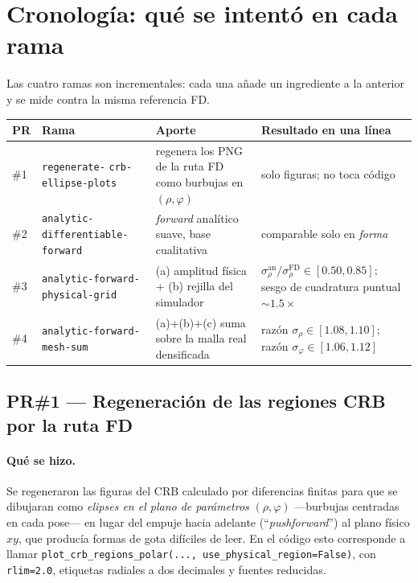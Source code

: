 \documentclass[11pt,a4paper]{article}
\newcommand{\code}[1]{\texttt{#1}}
\theoremstyle{definition}
\begin{document}
\section{Cronología: qué se intentó en cada rama}
\label{sec:cronologia}

Las cuatro ramas son incrementales: cada una añade un ingrediente a la
anterior y se mide contra la misma referencia FD.

\begin{center}
\small
\begin{tabular}{@{}lp{4.3cm}p{5.1cm}p{3.9cm}@{}}
\toprule
PR & Rama & Aporte & Resultado en una línea \\
\midrule
\#1 & \code{regenerate-} \code{crb-ellipse-plots} &
  regenera los PNG de la ruta FD como burbujas en $(\rho,\varphi)$ &
  solo figuras; no toca código \\
\addlinespace
\#2 & \code{analytic-} \code{differentiable-forward} &
  \emph{forward} analítico suave, base cualitativa &
  comparable solo en \emph{forma} \\
\addlinespace
\#3 & \code{analytic-forward-} \code{physical-grid} &
  (a) amplitud física + (b) rejilla del simulador &
  $\sigma_\rho^{\text{an}}/\sigma_\rho^{\text{FD}}\in[0.50,0.85]$;
  sesgo de cuadratura puntual $\sim1.5\times$ \\
\addlinespace
\#4 & \code{analytic-forward-} \code{mesh-sum} &
  (a)+(b)+(c) suma sobre la malla real densificada &
  razón $\sigma_\rho\in[1.08,1.10]$;
  razón $\sigma_\varphi\in[1.06,1.12]$ \\
\bottomrule
\end{tabular}
\end{center}

\subsection{PR\#1 --- Regeneración de las regiones CRB por la ruta FD}
\label{sec:pr1}

\paragraph{Qué se hizo.}
Se regeneraron las figuras del CRB calculado por diferencias finitas para que
se dibujaran como \emph{elipses en el plano de parámetros} $(\rho,\varphi)$
---burbujas centradas en cada pose--- en lugar del empuje hacia adelante
(\enquote{\emph{pushforward}}) al plano físico $xy$, que producía formas de gota
difíciles de leer. En el código esto corresponde a llamar
\code{plot\_crb\_regions\_polar(..., use\_physical\_region=False)}, con
\code{rlim=2.0}, etiquetas radiales a dos decimales y fuentes reducidas.
\end{document}
